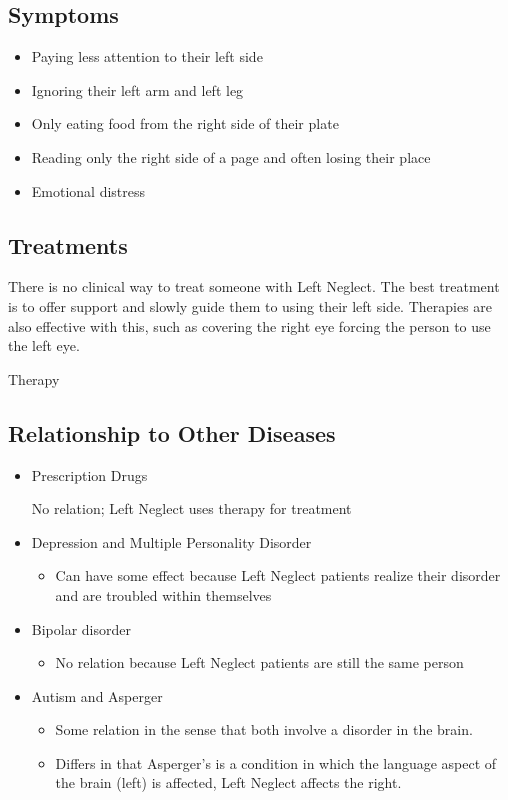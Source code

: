 \documentclass[journal]{IEEEtran}
\begin{document}
\subsection{Symptoms}
\begin{itemize}
\item Paying less attention to their left side
\item Ignoring their left arm and left leg
\item Only eating food from the right side of their plate
\item Reading only the right side of a page and often losing their place
\item Emotional distress
\end{itemize}
\subsection{Treatments}
There is no clinical way to treat someone with Left Neglect. The best treatment is to offer support and slowly guide them to using their left side. Therapies are also effective with this, such as covering the right eye forcing the person to use the left eye.
\begin{IEEEkeywords}
Therapy
\end{IEEEkeywords}
\subsection{Relationship to Other Diseases}
\begin{itemize}
\item Prescription Drugs
\begin{itemize}
No relation; Left Neglect uses therapy for treatment
\end{itemize}
\item Depression and Multiple Personality Disorder
\begin{itemize}
\item Can have some effect because Left Neglect patients realize their disorder and are troubled within themselves
\end{itemize}
\item Bipolar disorder
\begin{itemize}
\item No relation because Left Neglect patients are still the same person
\end{itemize}
\item Autism and Asperger
\begin{itemize}
\item Some relation in the sense that both involve a disorder in the brain.
\item Differs in that Asperger's is a condition in which the language aspect of the brain (left) is affected, Left Neglect affects the right.
\end{itemize}
\end{itemize}
\end{document}
